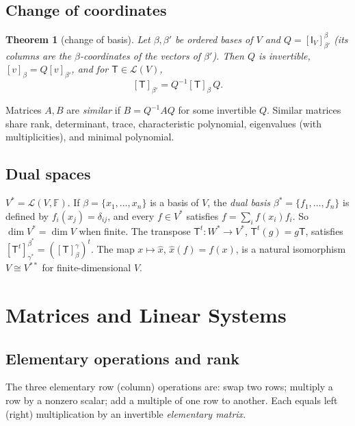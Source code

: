\documentclass[12pt]{article}
\newtheorem{theorem}{Theorem}[section]
\theoremstyle{definition}
\theoremstyle{remark}
\newcommand{\F}{\mathbb{F}}
\newcommand{\Lin}{\mathcal{L}}
\newcommand{\T}{\mathsf{T}}
\newcommand{\I}{\mathsf{I}}
\begin{document}
\subsection{Change of coordinates}
\begin{theorem}[change of basis]
Let $\beta,\beta'$ be ordered bases of $V$ and $Q=[\I_V]_{\beta'}^{\beta}$ (its columns are the $\beta$-coordinates of the vectors of $\beta'$).
Then $Q$ is invertible, $[v]_\beta=Q[v]_{\beta'}$, and for $\T\in\Lin(V)$,
\[
[\T]_{\beta'}=Q^{-1}[\T]_\beta\,Q .
\]
\end{theorem}
Matrices $A,B$ are \emph{similar} if $B=Q^{-1}AQ$ for some invertible $Q$. Similar matrices share rank, determinant,
trace, characteristic polynomial, eigenvalues (with multiplicities), and minimal polynomial.

\subsection{Dual spaces}
$V^{*}=\Lin(V,\F)$. If $\beta=\{x_1,\dots,x_n\}$ is a basis of $V$, the \emph{dual basis} $\beta^*=\{f_1,\dots,f_n\}$ is defined by
$f_i(x_j)=\delta_{ij}$, and every $f\in V^*$ satisfies $f=\sum_i f(x_i)f_i$. So $\dim V^*=\dim V$ when finite.
The transpose $\T^{t}\colon W^*\to V^*$, $\T^t(g)=g\T$, satisfies $[\T^t]_{\gamma^*}^{\beta^*}=([\T]_\beta^\gamma)^{t}$.
The map $x\mapsto\hat x$, $\hat x(f)=f(x)$, is a natural isomorphism $V\cong V^{**}$ for finite-dimensional $V$.

\section{Matrices and Linear Systems}

\subsection{Elementary operations and rank}
The three elementary row (column) operations are: swap two rows; multiply a row by a nonzero scalar; add a
multiple of one row to another. Each equals left (right) multiplication by an invertible \emph{elementary matrix}.
\end{document}
